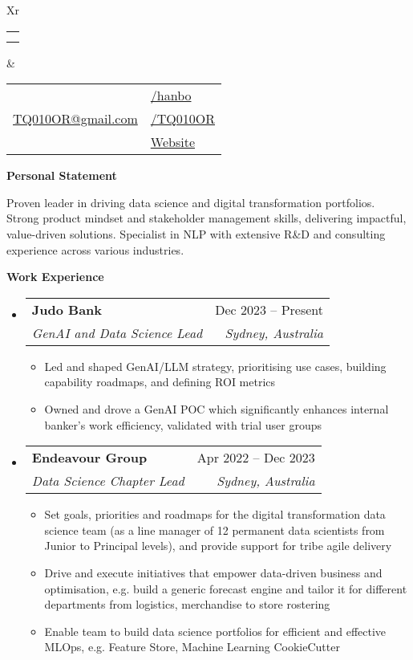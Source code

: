 \documentclass[letterpaper,12pt]{article}[leftmargin=*]
\makeatletter
\def \fullname {Bo HAN}
\def \subtitle {}
\def \linkedinicon {\faLinkedin}
\def \linkedinlink {https://linkedin.com/in/hanbo/}
\def \linkedintext {/hanbo}
\def \phoneicon {\faPhone}
\def \phonetext {+61-425-719-696}
\def \emailicon {\faEnvelope}
\def \emaillink {mailto:tq010or@gmail.com}
\def \emailtext {TQ010OR@gmail.com}
\def \githubicon {\faGithub}
\def \githublink {https://github.com/tq010or}
\def \githubtext {/TQ010OR}
\def \websiteicon {\faGlobe}
\def \websitelink {http://tq010or.github.io/}
\def \websitetext {Website}
\def \headertype {\doublecol} %
\def \entryspacing {-0pt}
\def \linkedin {\linkedinicon \hspace{3pt}\href{\linkedinlink}{\linkedintext}}
\def \phone {\phoneicon \hspace{3pt}{ \phonetext}}
\def \email {\emailicon \hspace{3pt}\href{\emaillink}{\emailtext}}
\def \github {\githubicon \hspace{3pt}\href{\githublink}{\githubtext}}
\def \website {\websiteicon \hspace{3pt}\href{\websitelink}{\websitetext}}
\renewcommand{\section}[2]{\vspace{5pt}
  \colorbox{secondary}{\color{white}\raggedbottom\normalsize\textbf{{#1}{\hspace{7pt}#2}}}
}
\newcommand{\resumeEntryStart}{\begin{itemize}[leftmargin=2.5mm]}
\newcommand{\resumeEntryEnd}{\end{itemize}\vspace{\entryspacing}}
\newcommand{\resumeItemListStart}{\begin{itemize}[leftmargin=4.5mm]}
\newcommand{\resumeItemListEnd}{\end{itemize}}
\newcommand{\resumeItem}[1]{
  \item\small{
    {#1 \vspace{-2pt}}
  }
}
\newcommand{\resumeText}[1]{
  \small{
    {#1 \vspace{-2pt}}
  }
}
\newcommand{\resumeEntryTSDL}[4]{
  \vspace{-1pt}\item[]
    \begin{tabularx}{0.97\textwidth}{X@{\hspace{60pt}}r}
      \textbf{\color{primary}#1} & {\firabook\color{accent}\small#2} \\
      \textit{\color{accent}\small#3} & \textit{\color{accent}\small#4} \\
    \end{tabularx}\vspace{-6pt}
}
\newcommand{\doublecol}[6]{
  \begin{tabularx}{\textwidth}{Xr}
    {
      \begin{tabular}[c]{l}
        \fontsize{35}{45}\selectfont{\color{primary}{{\textbf{\fullname}}}} \\
        {\textit{\subtitle}} %
      \end{tabular}
    } & {
      \begin{tabular}[c]{l@{\hspace{1.5em}}l}
        {\small#4} & {\small#1} \\
        {\small#5} & {\small#2} \\
        {\small#6} & {\small#3}
      \end{tabular}
    }
  \end{tabularx}
}
\newcommand{\singlecol}[6]{
  \begin{tabularx}{\textwidth}{Xr}
    {
      \begin{tabular}[b]{l}
        \fontsize{35}{45}\selectfont{\color{primary}{{\textbf{\fullname}}}} \\
        {\textit{\subtitle}} %
      \end{tabular}
    } & {
      \begin{tabular}[c]{l}
        {\small#1} \\
        {\small#2} \\
        {\small#3} \\
        {\small#4} \\
        {\small#5} \\
        {\small#6}
      \end{tabular}
    }
  \end{tabularx}
}
\makeatother
\begin{document}


\headertype{\linkedin}{\github}{\website}{\phone}{\email}{} %
\vspace{-8pt} %

\section{\faFlask}{Personal Statement}

    \resumeText{Proven leader in driving data science and digital transformation portfolios. Strong product mindset and stakeholder management skills, delivering impactful, value-driven solutions. Specialist in NLP with extensive R\&D and consulting experience across various industries. }

\section{\faPieChart}{Work Experience}
  \resumeEntryStart
    \resumeEntryTSDL
      {Judo Bank}{Dec 2023 -- Present}
      {GenAI and Data Science Lead}{Sydney, Australia}
    \resumeItemListStart
      \resumeItem {Led and shaped GenAI/LLM strategy, prioritising use cases, building capability roadmaps, and defining ROI metrics}
      \resumeItem {Owned and drove a GenAI POC which significantly enhances internal banker's work efficiency, validated with trial user groups}
    \resumeItemListEnd
  \resumeEntryEnd


  \resumeEntryStart
    \resumeEntryTSDL
      {Endeavour Group}{Apr 2022 -- Dec 2023}
      {Data Science Chapter Lead}{Sydney, Australia}
    \resumeItemListStart
      \resumeItem {Set goals, priorities and roadmaps for the digital transformation data science team (as a line manager of 12 permanent data scientists from Junior to Principal levels), and provide support for tribe agile delivery}
      \resumeItem {Drive and execute initiatives that empower data-driven business and optimisation, e.g. build a generic forecast engine and tailor it for different departments from logistics, merchandise to store rostering}
      \resumeItem {Enable team to build data science portfolios for efficient and effective MLOps, e.g. Feature Store, Machine Learning CookieCutter}
    \resumeItemListEnd
  \resumeEntryEnd
\end{document}
